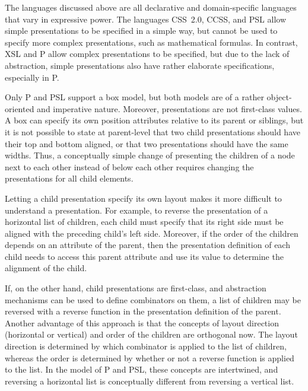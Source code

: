 
The languages discussed above are all declarative and domain-specific languages that vary in expressive power. The languages CSS~2.0, CCSS, and PSL allow simple presentations to be specified in a simple way, but cannot be used to specify more complex presentations, such as mathematical formulas. In contrast, XSL and P allow complex presentations to be specified, but due to the lack of abstraction, simple presentations also have rather elaborate specifications, especially in P. 

Only P and PSL support a box model, but both models are of a rather object-oriented and imperative nature. Moreover, presentations are not first-class values. A box can specify its own position attributes relative to its parent or siblings, but it is not possible to state at parent-level that two child presentations should have their top and bottom aligned, or that two presentations should have the same widths. \bc Thus, a conceptually simple change of presenting the children of a node next to each other instead of below each other requires changing the presentations for all child elements.\ec 

Letting a child presentation specify its own layout makes it more difficult to understand a presentation. For example, to reverse the presentation of a horizontal list of children, each child must specify that its right side must be aligned with the preceding child's left side. Moreover, if the order of the children depends on an attribute of the parent, then the presentation definition of each child needs to access this parent attribute and use its value to determine the alignment of the child.

If, on the other hand, child presentations are first-class, and abstraction mechanisms can be used to define combinators on them, a list of children may be reversed with a reverse function in the presentation definition of the parent.  Another advantage of this approach is that the concepts of layout direction (horizontal or vertical) and order of the children are orthogonal now. The layout direction is determined by which combinator is applied to the list of children, whereas the order is determined by whether or not a reverse function is applied to the list. In the model of P and PSL, these concepts are intertwined, and reversing a horizontal list is conceptually different from reversing a vertical list.


